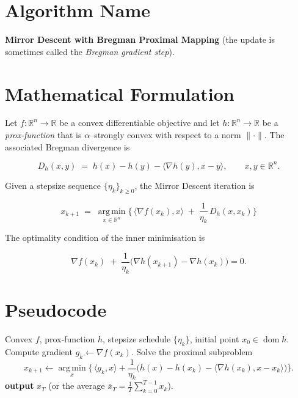 \documentclass{article}
\newcommand{\argmin}{\operatorname*{arg\,min}}
\newcommand{\ip}[2]{\langle #1,#2\rangle}
\newcommand{\DD}[2]{D_{h}(#1,#2)}
\newcommand{\grad}{\nabla}
\begin{document}
\section*{Algorithm Name}
\textbf{Mirror Descent with Bregman Proximal Mapping}  
(the update is sometimes called the \emph{Bregman gradient step}).

\section*{Mathematical Formulation}
Let $f:\mathbb{R}^{n}\rightarrow\mathbb{R}$ be a convex differentiable objective and let
$h:\mathbb{R}^{n}\rightarrow\mathbb{R}$ be a \emph{prox‑function} that is
$\alpha$–strongly convex with respect to a norm $\|\cdot\|$.
The associated Bregman divergence is  

\[
\DD{x}{y}\;=\;h(x)-h(y)-\ip{\grad h(y)}{x-y},\qquad x,y\in\mathbb{R}^{n}.
\]

Given a stepsize sequence $\{\eta_k\}_{k\ge 0}$, the Mirror Descent iteration is  

\[
\boxed{
x_{k+1}\;=\;\argmin_{x\in\mathbb{R}^{n}}
\Big\{\,\ip{\grad f(x_k)}{x}\;+\;\frac{1}{\eta_k}\,\DD{x}{x_k}\Big\}
}\tag{MD}
\]

The optimality condition of the inner minimisation is  

\[
\grad f(x_k)\;+\;\frac{1}{\eta_k}\big(\grad h(x_{k+1})-\grad h(x_k)\big)=0.
\tag{1}
\]

\section*{Pseudocode}
\begin{algorithm}[H]
\caption{Mirror Descent (Bregman Proximal Mapping)}\label{alg:MD}
\begin{algorithmic}[1]
\Require Convex $f$, prox‑function $h$, stepsize schedule $\{\eta_k\}$,
initial point $x_0\in\operatorname{dom}h$.
    \State Compute gradient $g_k\gets\grad f(x_k)$.
    \State Solve the proximal subproblem
    \[
        x_{k+1}\gets\argmin_{x}\Big\{\,\ip{g_k}{x}
               +\frac{1}{\eta_k}\big(h(x)-h(x_k)-\ip{\grad h(x_k)}{x-x_k}\big)\Big\}.
    \]
\EndFor
\State \textbf{output} $x_T$ (or the average $\bar x_T=\frac1T\sum_{k=0}^{T-1}x_k$).
\end{algorithmic}
\end{algorithm}
\end{document}
